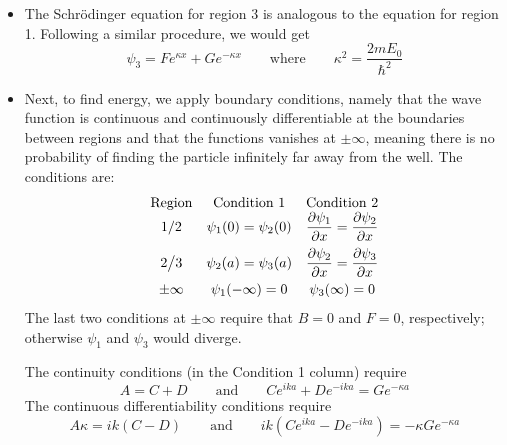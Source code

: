 \documentclass[11pt, a4paper]{article}
\newcommand{\eqtext}[1]{\qquad \text{#1} \qquad}
\newcommand{\schro}{Schr\"{o}dinger\xspace}
\begin{document}
\begin{itemize}
	\item The \schro equation for region 3 is analogous to the equation for region 1. Following a similar procedure, we would get
	\begin{equation*}
		\psi_{3} = Fe^{\kappa x} + Ge^{-\kappa x} \eqtext{where} \kappa^{2} = \frac{2mE_{0}}{\hbar^{2}}
	\end{equation*}
	
	\item Next, to find energy, we apply boundary conditions, namely that the wave function is continuous and continuously differentiable at the boundaries between regions and that the functions vanishes at $ \pm \infty $, meaning there is no probability of finding the particle infinitely far away from the well. The conditions are:
	\[
		\begin{array}{ccc}
			\text{Region} & \text{Condition 1} & \text{Condition 2}\\
			1/2 & \psi_{1}(0) = \psi_{2}(0) &\displaystyle \pdv{\psi_{1}}{x} (0) = \pdv{\psi_{2}}{x} (0)\\[3mm]
			2\big/3 & \psi_{2}(a) = \psi_{3} (a) &\displaystyle \pdv{\psi_{2}}{x} (a) = \pdv{\psi_{3}}{x} (a)\\[2.5mm]
			\pm \infty & \psi_{1}(-\infty) = 0 & \psi_{3}(\infty) = 0
		\end{array}
	\]
	The last two conditions at $ \pm \infty $ require that $ B = 0 $ and $ F = 0 $, respectively; otherwise $ \psi_{1} $ and $ \psi_{3} $ would diverge.
	
	The continuity conditions (in the Condition 1 column) require
	\begin{equation*}
		A = C + D \eqtext{and} Ce^{ika} + De^{-ika} = Ge^{-\kappa a}
	\end{equation*}
	The continuous differentiability conditions require 
	\begin{equation*}
		A\kappa = ik(C-D) \eqtext{and} ik(Ce^{ika} - De^{-ika}) = - \kappa Ge^{-\kappa a}
	\end{equation*}
	

\end{itemize}
\end{document}
